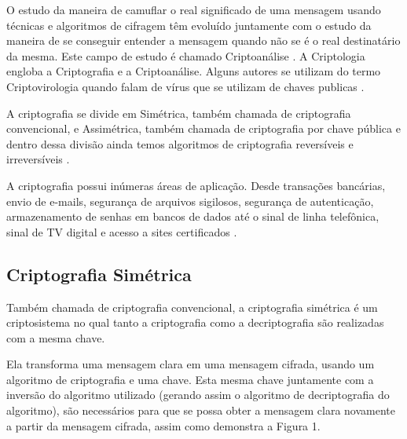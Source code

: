 O estudo da maneira de camuflar o real significado de uma mensagem usando técnicas e algoritmos de cifragem têm evoluído juntamente com o estudo da maneira de se conseguir entender a mensagem quando não se é o real destinatário da mesma. Este campo de estudo é chamado Criptoanálise \cite{gaines56}. A Criptologia engloba a Criptografia e a Criptoanálise. Alguns autores se utilizam do termo Criptovirologia quando falam de vírus que se utilizam de chaves publicas \cite{young04}.


A criptografia se divide em Simétrica, também chamada de criptografia convencional, e Assimétrica, também chamada de criptografia por chave pública \cite{stallings14} e dentro dessa divisão ainda temos algoritmos de criptografia reversíveis e irreversíveis \cite{stallings14} \cite{itu91}.

A criptografia possui inúmeras áreas de aplicação. Desde transações bancárias, envio de e-mails, segurança de arquivos sigilosos, segurança de autenticação, armazenamento de senhas em bancos de dados até o sinal de linha telefônica, sinal de TV digital e acesso a sites certificados \cite{avelino07}.

\subsection{Criptografia Simétrica}
\label{subsec:criptografiasync}
Também chamada de criptografia convencional, a criptografia simétrica é um criptosistema no qual tanto a criptografia como a decriptografia são realizadas com a mesma chave.

Ela transforma uma mensagem clara em uma mensagem cifrada, usando um algoritmo de criptografia e uma chave. Esta mesma chave juntamente com a inversão do algoritmo utilizado (gerando assim o algoritmo de decriptografia do algoritmo), são necessários para que se possa obter a mensagem clara novamente a partir da mensagem cifrada, assim como demonstra a Figura 1.

